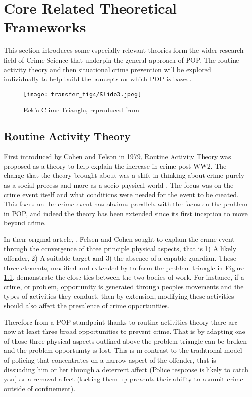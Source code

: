 \chapter{Core Related Theoretical Frameworks} This section introduces some especially relevant theories form the wider research field of Crime Science that underpin the general approach of POP. The routine activity theory \parencite{cohen1979social}and then situational crime prevention \parencite{clarke1997situational} will be explored individually to help build the concepts on which POP is based.

\begin{figure}
  \texttt{[image: transfer\_figs/Slide3.jpeg]}
  \caption{Eck's Crime Triangle, reproduced from \cite{eck2003police}}
  \label{fig:triangle}
\end{figure}

\section{Routine Activity Theory}  First introduced by Cohen and Felson in 1979, Routine Activity Theory was proposed as a theory to help explain the increase in crime post WW2. The change that the theory brought about was a shift in thinking about crime purely as a social process and more as a socio-physical world \parencite{ratchap4}. The focus was on the crime event itself and what conditions were needed for the event to be created. This focus on the crime event has obvious parallels with the focus on the problem in POP, and indeed the theory has been extended since its first inception to move beyond crime.  

In their original article, \parencite{cohen1979social}, Felson and Cohen sought to explain the crime event through the convergence of three principle physical aspects, that is 1) A likely offender, 2) A suitable target and 3) the absence of a capable guardian. These three elements, modified and extended by \parencite{eck2003police} to form the problem triangle in Figure \ref{fig:triangle}, demonstrate the close ties between the two bodies of work. For instance, if a crime, or problem, opportunity is generated through peoples movements and the types of activities they conduct, then by extension, modifying these activities should also affect the prevalence of crime opportunities. 

Therefore from a POP standpoint thanks to routine activities theory there are now at least three broad opportunities to prevent crime. That is by adapting one of those three physical aspects outlined above the problem triangle can be broken and the problem opportunity is lost.  This is in contrast to the traditional model of policing that concentrates on a narrow aspect of the offender, that is dissuading him or her through a deterrent affect (Police response is likely to catch you) or a removal affect (locking them up prevents their ability to commit crime outside of confinement). 



